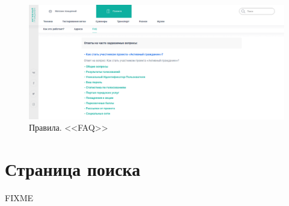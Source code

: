         \begin{figure}
            \includegraphics[width=170mm]{02_noauth_funcs/figures/11.eps}
            \caption{Правила. <<FAQ>>}
            \label{fig:page_faq}
        \end{figure} 
            
            
    \section{Страница поиска}
        \label{search_page}
        
        FIXME

